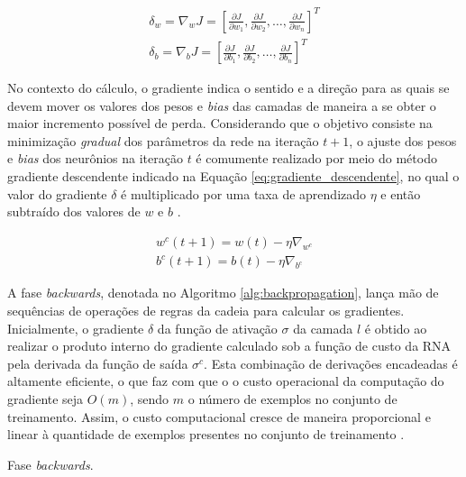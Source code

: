 \begin{gather}\label{eq:gradiente}
	\delta_w = \nabla_{w} J = \left[
							\frac{\partial J}{\partial w_1}, \frac{\partial J}{\partial w_2}, \ldots, \frac{\partial J}{\partial w_n}
						\right]^T\\
	\delta_b = \nabla_{b} J = \left[
							\frac{\partial J}{\partial b_1}, \frac{\partial J}{\partial b_2}, \ldots, \frac{\partial J}{\partial b_n}
						\right]^T
\end{gather}

No contexto do cálculo, o gradiente indica o sentido e a direção para as quais se devem mover os valores dos pesos e \emph{bias} das camadas de maneira a se obter o maior incremento possível de perda. Considerando que o objetivo consiste na minimização \emph{gradual} dos parâmetros da rede na iteração $t+1$, o ajuste dos pesos e \emph{bias} dos neurônios na iteração $t$ é comumente realizado por meio do método gradiente descendente indicado na Equação \ref{eq:gradiente_descendente}, no qual o valor do gradiente $\delta$ é multiplicado por uma taxa de aprendizado $\eta$ e então subtraído dos valores de $w$ e $b$ \cite{haykin2009neural, goodfellow2016deep}.

\begin{gather}\label{eq:gradiente_descendente}
	w^c(t+1) = w(t) - \eta \nabla_{w^c} \\
	b^c(t+1) = b(t) - \eta \nabla_{b^c}
\end{gather}

A fase \emph{backwards}, denotada no Algoritmo \ref{alg:backpropagation}, lança mão de sequências de operações de regras da cadeia para calcular os gradientes. Inicialmente, o gradiente $\delta$ da função de ativação $\sigma$ da camada $l$ é obtido ao realizar o produto interno do gradiente calculado sob a função de custo da RNA pela derivada da função de saída $\sigma^c$. Esta combinação de derivações encadeadas é altamente eficiente, o que faz com que o o custo operacional da computação do gradiente seja $O(m)$, sendo $m$ o número de exemplos no conjunto de treinamento. Assim, o custo computacional cresce de maneira proporcional e linear à quantidade de exemplos presentes no conjunto de treinamento \cite{haykin2009neural, goodfellow2016deep}.

\begin{algorithm}
	\caption{Fase \emph{backwards}.}\label{alg:backpropagation}
\end{algorithm}

